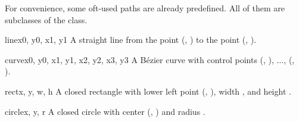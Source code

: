 \label{path:predefined}

For convenience, some oft-used paths are already predefined. All
of them are subclasses of the  class.

\begin{classdesc}{line}{x0, y0, x1, y1}
A straight line from the point (, ) to the point (, ).
\end{classdesc}

\begin{classdesc}{curve}{x0, y0, x1, y1, x2, y2, x3, y3}
A B\'ezier curve with 
control points  (, ), $\dots$, (, ).\
\end{classdesc}

\begin{classdesc}{rect}{x, y, w, h}
A closed rectangle with lower left point (, ), width , and
  height \var{h}.
\end{classdesc}

\begin{classdesc}{circle}{x, y, r}
A closed circle with center (, ) and radius .
\end{classdesc}

